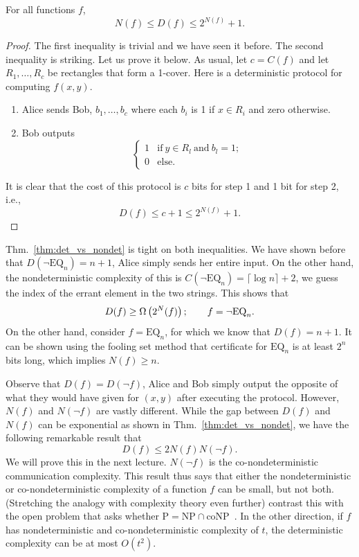 \documentclass[letterpaper]{article}
\providecommand\rbrac[1]{\ensuremath \left(#1\right)}
\providecommand{\bigo}{O}
\newcommand{\df}{D(f)}
\newcommand{\dnf}{D(\neg f)}
\newcommand{\nf}{N(f)}
\newcommand{\nnf}{N(\neg f)}
\newcommand{\cf}{C(f)}
\newcommand{\EQ}{\mathrm{EQ}}
\newcommand{\nEQ}{\neg \mathrm{EQ}}
\renewcommand{\P}{\mathrm{P}}
\newcommand{\NP}{\mathrm{NP}}
\newcommand{\coNP}{\mathrm{coNP}}
\begin{document}
\begin{theorem}
\label{thm:det_vs_nondet}
For all functions $f$,
$$
\nf \leq \df \leq 2^{\nf} + 1.
$$
\end{theorem}
\begin{proof}
The first inequality is trivial and we have seen it before. The second inequality is striking. Let us prove it below. As usual, let $c = \cf$ and let $R_1, \ldots, R_c$ be rectangles that form a 1-cover. Here is a deterministic protocol for computing $f(x,y)$.
\begin{enumerate}
    \item Alice sends Bob, $b_1, \ldots, b_c$ where each $b_i$ is 1 if $x \in R_i$ and zero otherwise.
    \item Bob outputs
        $$
            \begin{cases}
            1 & \mathrm{if}\ y \in R_l\ \mathrm{and}\ b_l = 1;\\
            0 & \mathrm{else.}
            \end{cases}
         $$
\end{enumerate}
It is clear that the cost of this protocol is $c$ bits for step 1 and 1 bit for step 2, i.e.,
$$
\df \leq c+1 \leq 2^{\nf} + 1.
$$
\end{proof}

\begin{remark}
Thm.~\ref{thm:det_vs_nondet} is tight on both inequalities. We have shown before that $D(\nEQ_n) = n+1$, Alice simply sends her entire input. On the other hand, the nondeterministic complexity of this is $C(\nEQ_n) = \lceil \log n \rceil + 2$, we guess the index of the errant element in the two strings. This shows that
$$
D(f) \geq \Omega \rbrac{2^\nf}; \qquad f = \nEQ_n.
$$
On the other hand, consider $f = \EQ_n$, for which we know that $\df = n+1$. It can be shown using the fooling set method that certificate for $\EQ_n$ is at least $2^n$ bits long, which implies $\nf \geq n$.
\end{remark}

Observe that $\df = \dnf$, Alice and Bob simply output the opposite of what they would have given for $(x,y)$ after executing the protocol. However, $\nf$ and $\nnf$ are vastly different. While the gap between $\df$ and $\nf$ can be exponential as shown in Thm.~\ref{thm:det_vs_nondet}, we have the following remarkable result that
$$
\df \leq 2 \nf \nnf.
$$
We will prove this in the next lecture. $\nnf$ is the co-nondeterministic communication complexity. This result thus says that either the nondeterministic or co-nondeterministic complexity of a function $f$ can be small, but not both. (Stretching the analogy with complexity theory even further) contrast this with the open problem that asks whether $\P = \NP \cap \coNP$~\cite{papadimitriou1984communication}. In the other direction, if $f$ has nondeterministic and co-nondeterministic complexity of $t$, the deterministic complexity can be at most $\bigo(t^2)$.




\end{document}
